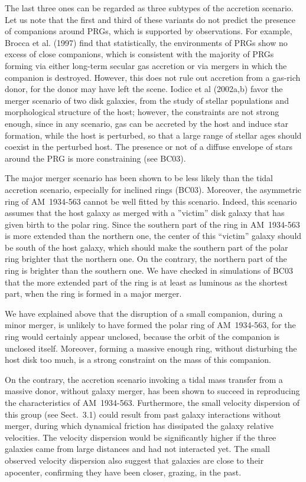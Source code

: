 \documentclass[]{aa}
\begin{document}
The last three ones can be regarded as three subtypes of the accretion 
scenario. Let us note that the first and third of these variants do 
not predict the presence of companions around PRGs, which is supported 
by observations. For example, Brocca et al. (1997) find that 
statistically, the environments of PRGs show no excess of close 
companions, which is consistent with the majority of PRGs forming 
via either long-term secular gas accretion or via mergers in which 
the companion is destroyed. However, this does not rule out accretion from a 
gas-rich donor, for the donor may have left the scene. Iodice et al (2002a,b) 
favor the merger scenario of two disk galaxies, from the study of stellar 
populations and morphological structure of the host; however, the constraints 
are not strong enough, since in any scenario, gas can be accreted by the host 
and induce star formation, while the host is perturbed, so that a large range 
of stellar ages should coexist in the perturbed host. The presence or not of a 
diffuse envelope of stars around the PRG is more constraining (see BC03).

The major merger scenario has been shown to be less likely than the tidal 
accretion scenario, especially for inclined rings (BC03). Moreover, the 
asymmetric ring of AM~1934-563 cannot be well fitted by this scenario. 
Indeed, this scenario assumes that the host galaxy as merged with a 
''victim'' disk galaxy that has given birth to the polar ring. Since the 
southern part of the ring in AM~1934-563 is more extended than the northern 
one, the center of this ``victim'' galaxy should be  south of the host 
galaxy, which should make the southern part of the polar ring brighter 
that the northern one. On the contrary, the northern part of the ring 
is brighter than the southern one. We have checked in simulations of 
BC03 that the more extended part of the ring is at least as luminous as 
the shortest part, when the ring is formed in a major merger.

We have explained above that the disruption of a small companion, during 
a minor merger, is unlikely to have formed the polar ring of AM~1934-563, 
for the ring would certainly appear unclosed, because the orbit of the 
companion is unclosed itself. Moreover, forming a massive enough ring, 
without disturbing the host disk too much, is a strong constraint on the 
mass of this companion.

On the contrary, the accretion scenario invoking a tidal mass transfer from 
a massive donor, without galaxy merger, has been shown to succeed in 
reproducing the characteristics of AM~1934-563. Furthermore, the small 
velocity dispersion of this group (see Sect.~3.1) could result from past 
galaxy interactions without merger, during which dynamical friction has 
dissipated the galaxy relative velocities. The velocity dispersion would 
be significantly higher if the three galaxies came from large distances 
and had not interacted yet. The small observed velocity dispersion 
also suggest that galaxies are close to their apocenter, confirming 
they have been closer, grazing, in the past.
\end{document}

